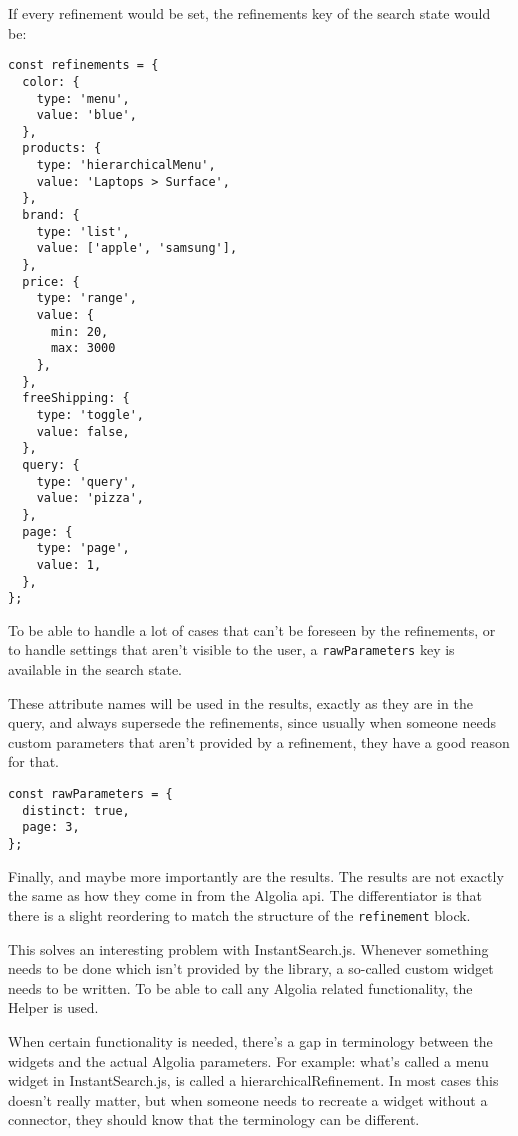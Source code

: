 If every refinement would be set, the \glspl{refinement} key of the search state would be:

\begin{minipage}{\linewidth}
\begin{lstlisting}[caption={\Glspl{refinement} in InstantSearch Core},label={lst:is-core-state-2}]
const refinements = {
  color: {
    type: 'menu',
    value: 'blue',
  },
  products: {
    type: 'hierarchicalMenu',
    value: 'Laptops > Surface',
  },
  brand: {
    type: 'list',
    value: ['apple', 'samsung'],
  },
  price: {
    type: 'range',
    value: {
      min: 20,
      max: 3000
    },
  },
  freeShipping: {
    type: 'toggle',
    value: false,
  },
  query: {
    type: 'query',
    value: 'pizza',
  },
  page: {
    type: 'page',
    value: 1,
  },
};
\end{lstlisting}
\end{minipage}

To be able to handle a lot of cases that can't be foreseen by the \glspl{refinement}, or to handle settings that aren't visible to the user, a {\tt rawParameters} key is available in the search state. 

These \gls{attribute} names will be used in the results, exactly as they are in the query, and always supersede the \glspl{refinement}, since usually when someone needs custom parameters that aren't provided by a refinement, they have a good reason for that.

\begin{minipage}{\linewidth}
\begin{lstlisting}[caption={Passing raw Algolia parameters to InstantSearch Core},label={lst:is-core-state-3}]
const rawParameters = {
  distinct: true,
  page: 3,
};
\end{lstlisting}
\end{minipage}

Finally, and maybe more importantly are the results. The results are not exactly the same as how they come in from the Algolia \acrshort{api}. The differentiator is that there is a slight reordering to match the structure of the {\tt refinement} block.

This solves an interesting problem with InstantSearch.js. Whenever something needs to be done which isn't provided by the \gls{library}, a so-called custom widget needs to be written. To be able to call any Algolia related functionality, the Helper is used. 

When certain functionality is needed, there's a gap in terminology between the widgets and the actual Algolia parameters. For example: what's called a menu widget in InstantSearch.js, is called a hierarchicalRefinement. In most cases this doesn't really matter, but when someone needs to recreate a widget without a connector, they should know that the terminology can be different.

